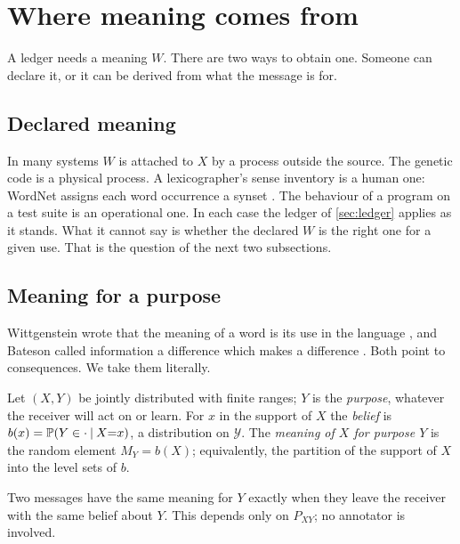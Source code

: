 \section{Where meaning comes from}\label{sec:meaning}
A ledger needs a meaning $W$. There are two ways to obtain one. Someone can declare it, or it can be derived from what the message is for.

\subsection{Declared meaning}
In many systems $W$ is attached to $X$ by a process outside the source. The genetic code is a physical process. A lexicographer's sense inventory is a human one: WordNet assigns each word occurrence a synset \citep{miller1995,fellbaum1998}. The behaviour of a program on a test suite is an operational one.
In each case the ledger of \cref{sec:ledger} applies as it stands. What it cannot say is whether the declared $W$ is the right one for a given use. That is the question of the next two subsections.

\subsection{Meaning for a purpose}
Wittgenstein wrote that the meaning of a word is its use in the language \citep{wittgenstein1953}, and Bateson called information a difference which makes a difference \citep{bateson1972}. Both point to consequences. We take them literally.

\begin{definition}\label{def:purpose}
Let $(X,Y)$ be jointly distributed with finite ranges; $Y$ is the \emph{purpose}, whatever the receiver will act on or learn. For $x$ in the support of $X$ the \emph{belief} is $b(x)=\mathbb{P}(Y\in\cdot\mathbin{\vert} X{=}x)$, a distribution on $\mathcal Y$.
The \emph{meaning of $X$ for purpose $Y$} is the random element $M_Y=b(X)$; equivalently, the partition of the support of $X$ into the level sets of $b$.
\end{definition}
Two messages have the same meaning for $Y$ exactly when they leave the receiver with the same belief about $Y$. This depends only on $P_{XY}$; no annotator is involved.

